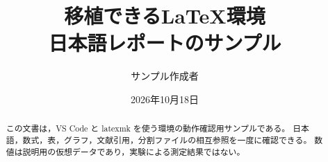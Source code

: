 \documentclass[a4paper,11pt]{ltjsarticle}
\title{移植できる\LaTeX 環境\\[0.4em]\large 日本語レポートのサンプル}
\author{サンプル作成者}
\date{2026年10月18日}
\begin{document}
\maketitle
\begin{abstract}
この文書は，VS Code と latexmk を使う環境の動作確認用サンプルである。
日本語，数式，表，グラフ，文献引用，分割ファイルの相互参照を一度に確認できる。
数値は説明用の仮想データであり，実験による測定結果ではない。
\end{abstract}







\end{document}

